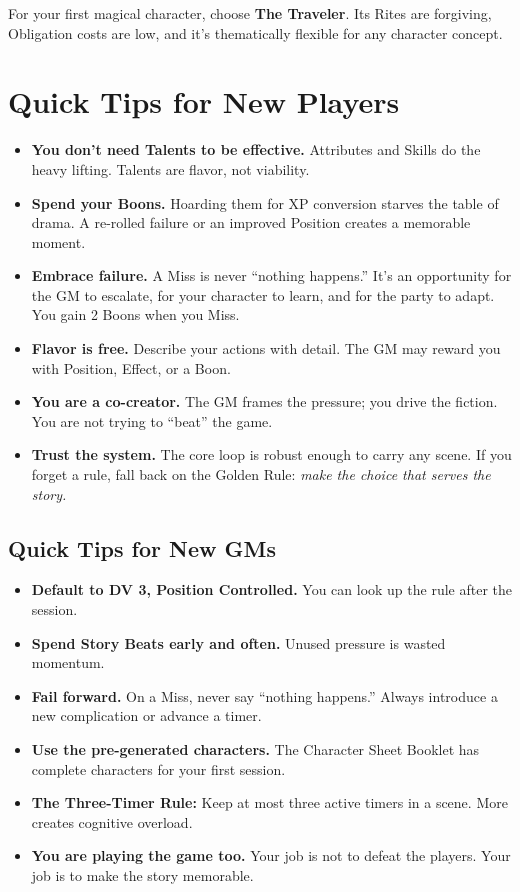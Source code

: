 \documentclass[10pt]{article}
\begin{document}
\vspace{0.5cm}
\begin{infobox}
For your first magical character, choose \textbf{The Traveler}. Its Rites are forgiving, Obligation costs are low, and it's thematically flexible for any character concept.
\end{infobox}

\newpage

\section*{Quick Tips for New Players}

\begin{itemize}
\item \textbf{You don't need Talents to be effective.} Attributes and Skills do the heavy lifting. Talents are flavor, not viability.
\item \textbf{Spend your Boons.} Hoarding them for XP conversion starves the table of drama. A re-rolled failure or an improved Position creates a memorable moment.
\item \textbf{Embrace failure.} A Miss is never ``nothing happens.'' It's an opportunity for the GM to escalate, for your character to learn, and for the party to adapt. You gain 2 Boons when you Miss.
\item \textbf{Flavor is free.} Describe your actions with detail. The GM may reward you with Position, Effect, or a Boon.
\item \textbf{You are a co-creator.} The GM frames the pressure; you drive the fiction. You are not trying to ``beat'' the game.
\item \textbf{Trust the system.} The core loop is robust enough to carry any scene. If you forget a rule, fall back on the Golden Rule: \textit{make the choice that serves the story.}
\end{itemize}

\subsection*{Quick Tips for New GMs}

\begin{itemize}
\item \textbf{Default to DV 3, Position Controlled.} You can look up the rule after the session.
\item \textbf{Spend Story Beats early and often.} Unused pressure is wasted momentum.
\item \textbf{Fail forward.} On a Miss, never say ``nothing happens.'' Always introduce a new complication or advance a timer.
\item \textbf{Use the pre-generated characters.} The Character Sheet Booklet has complete characters for your first session.
\item \textbf{The Three-Timer Rule:} Keep at most three active timers in a scene. More creates cognitive overload.
\item \textbf{You are playing the game too.} Your job is not to defeat the players. Your job is to make the story memorable.
\end{itemize}
\end{document}
